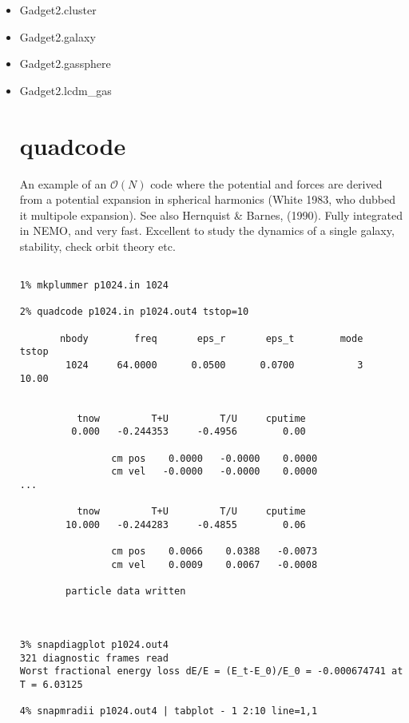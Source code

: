 \begin{itemize}
\item Gadget2.cluster  
\item Gadget2.galaxy   
\item Gadget2.gassphere
\item Gadget2.lcdm_gas 
\begin{itemize}

\section{quadcode}


An example of an $\mathcal{O}(N)$ code where the potential and forces are derived from
a potential expansion in spherical harmonics  (White 1983, who dubbed it multipole expansion). 
See also Hernquist \& Barnes, (1990). Fully integrated
in NEMO, and very fast. Excellent to study the dynamics of a single galaxy,
stability, check orbit theory etc.

\footnotesize\begin{verbatim}

1% mkplummer p1024.in 1024

2% quadcode p1024.in p1024.out4 tstop=10

       nbody        freq       eps_r       eps_t        mode       tstop
        1024     64.0000      0.0500      0.0700           3       10.00
 
 
          tnow         T+U         T/U     cputime
         0.000   -0.244353     -0.4956        0.00
 
                cm pos    0.0000   -0.0000    0.0000
                cm vel   -0.0000   -0.0000    0.0000
...

          tnow         T+U         T/U     cputime
        10.000   -0.244283     -0.4855        0.06
 
                cm pos    0.0066    0.0388   -0.0073
                cm vel    0.0009    0.0067   -0.0008
 
        particle data written



3% snapdiagplot p1024.out4
321 diagnostic frames read
Worst fractional energy loss dE/E = (E_t-E_0)/E_0 = -0.000674741 at T = 6.03125

4% snapmradii p1024.out4 | tabplot - 1 2:10 line=1,1

\end{verbatim}\normalsize



\end{itemize}
\end{itemize}
